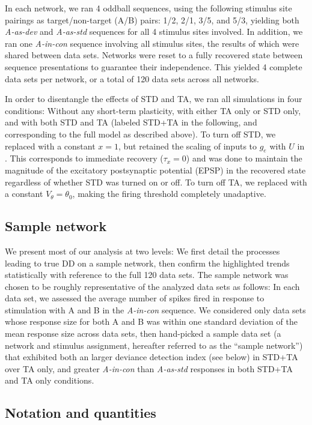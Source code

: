 \documentclass[9pt,lineno,onehalfspacing]{elife}
\newcommand{\dev}{\textit{A-as-dev}}
\newcommand{\msc}{\textit{A-in-con}}
\newcommand{\std}{\textit{A-as-std}}
\begin{document}
In each network, we ran 4 oddball sequences, using the following stimulus site pairings as target/non-target (A/B) pairs: 1/2, 2/1, 3/5, and 5/3, yielding both \dev{} and \std{} sequences for all 4 stimulus sites involved. In addition, we ran one \msc{} sequence involving all stimulus sites, the results of which were shared between data sets. Networks were reset to a fully recovered state between sequence presentations to guarantee their independence. This yielded 4 complete data sets per network, or a total of 120 data sets across all networks.

In order to disentangle the effects of STD and TA, we ran all simulations in four conditions: Without any short-term plasticity, with either TA only or STD only, and with both STD and TA (labeled STD+TA in the following, and corresponding to the full model as described above). To turn off STD, we replaced  with a constant $x = 1$, but retained the scaling of inputs to $g_e$ with $U$ in . This corresponds to immediate recovery ($\tau_x = 0$) and was done to maintain the magnitude of the excitatory postsynaptic potential (EPSP) in the recovered state regardless of whether STD was turned on or off. To turn off TA, we replaced  with a constant $V_{\theta} = \theta_0$, making the firing threshold completely unadaptive.

\subsection{Sample network}\label{sec:sample}

We present most of our analysis at two levels: We first detail the processes leading to true DD on a sample network, then confirm the highlighted trends statistically with reference to the full 120 data sets. The sample network was chosen to be roughly representative of the analyzed data sets as follows: In each data set, we assessed the average number of spikes fired in response to stimulation with A and B in the \msc{} sequence. We considered only data sets whose response size for both A and B was within one standard deviation of the mean response size across data sets, then hand-picked a sample data set (a network and stimulus assignment, hereafter referred to as the ``sample network'') that exhibited both an larger deviance detection index (see  below) in STD+TA over TA only, and greater \msc{} than \std{} responses in both STD+TA and TA only conditions.

\subsection{Notation and quantities}\label{sec:notation}
\end{document}
